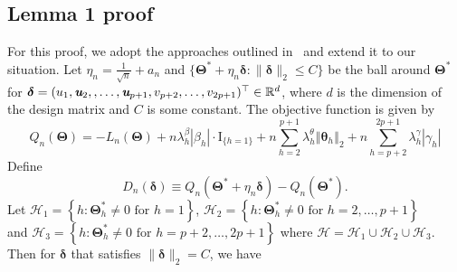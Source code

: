 \documentclass[12pt,letter]{article}\usepackage[]{graphicx}\usepackage[]{color}
\newcommand{\bTheta}{\boldsymbol{\Theta}}
\newcommand{\btheta}{\boldsymbol{\theta}}
\newcommand{\bThetastar}{\boldsymbol{\Theta}^{*}}
\newcommand{\bdelta}{\boldsymbol{\delta}}
\begin{document}
\subsection{Lemma 1 proof} \label{ap:lemma1proof}
For this proof, we adopt the approaches outlined in~\citep{fan2001variable,choi2010variable,nardi2008asymptotic,wang2007regression} and extend it to our situation. Let $\eta_{n}=\frac{1}{\sqrt{n}}+a_{n}$ and $\{\bTheta^{*}+\eta_{n}\boldsymbol{\delta}:\|\boldsymbol{\delta}\|_2\leq C\}$
be the ball around $\bTheta^{*}$ for $\boldsymbol{\delta}=(u_{1}, \textit{\textbf{u}}_2, ,\ldots, \textit{\textbf{u}}_{p+1},v_{p+2},\ldots,v_{2p+1})^{\top} \in \mathbb{R}^d$, where $d$ is the dimension of the design matrix and $C$ is some constant. The objective function is given by
\begin{equation*}
Q_n(\bTheta)
=-L_n(\bTheta)+n\lambda_{h}^{\beta}\left|\beta_{h}\right| \cdot \textrm{I}_{\lbrace h=1 \rbrace} + n\sum_{h=2}^{p+1}      \lambda_{h}^{\theta}\left\Vert \btheta_{h}\right\Vert _{2}  +n\sum_{h=p+2}^{2p+1}\lambda_{h}^{\gamma}\left|\gamma_{h}\right|
\end{equation*}
Define 
\[ D_{n}(\boldsymbol{\delta})\equiv Q_{n}(\bThetastar+\eta_{n}\bdelta)-Q_{n}(\bThetastar).\] Let $\mathcal{H}_1=\left\lbrace h : \bThetastar_h \neq 0 \textrm{ for }h=1 \right\rbrace$, $\mathcal{H}_2=\left\lbrace h : \bThetastar_h \neq 0 \textrm{ for }h=2, \ldots, p+1 \right\rbrace$ \\and $\mathcal{H}_3=\left\lbrace h : \bThetastar_h \neq 0 \textrm{ for }h=p+2, \ldots, 2p+1 \right\rbrace$ where $\mathcal{H} = \mathcal{H}_1 \cup \mathcal{H}_2 \cup \mathcal{H}_3$. Then for $\bdelta$ that satisfies $\|\bdelta\|_2=C$, we have
\end{document}
